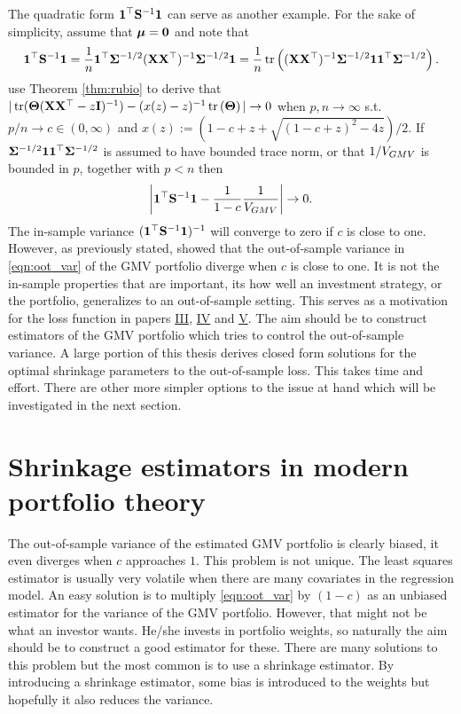 \documentclass[12pt, twoside]{book}\usepackage{knitr}
\begin{document}
The quadratic form $\mathbf{1}^\top \mathbf{S}^{-1} \mathbf{1}$ can serve as another example. 
For the sake of simplicity, assume that $\mbox{\boldmath$\mu$} = \mathbf{0}$ and note that
\begin{equation}
  \mathbf{1}^\top \mathbf{S}^{-1} \mathbf{1} = \frac{1}{n}\mathbf{1}^\top \mathbf{\Sigma}^{-1/2} (\mathbf{X} \mathbf{X}^\top)^{-1} \mathbf{\Sigma}^{-1/2} \mathbf{1} = \frac{1}{n}\operatorname{tr} \left((\mathbf{X} \mathbf{X}^\top)^{-1} \mathbf{\Sigma}^{-1/2} \mathbf{1}\mathbf{1}^\top \mathbf{\Sigma}^{-1/2}\right).
\end{equation}
\citet{bodnar2018estimation} use Theorem \ref{thm:rubio} to derive that $|\operatorname{tr}(\mathbf{\Theta}(\mathbf{X} \mathbf{X}^\top -z\mathbf{I})^{-1}) - (x(z)-z)^{-1}\operatorname{tr}\left(\mathbf{\Theta}\right)| \rightarrow 0$ when $p,n \rightarrow \infty$ s.t. $p/n \rightarrow c \in (0,\infty)$ and $x(z) := (1-c + z + \sqrt{(1-c+z)^2-4z})/2$.
If $\mathbf{\Sigma}^{-1/2} \mathbf{1}\mathbf{1}^\top \mathbf{\Sigma}^{-1/2}$ is assumed to have bounded trace norm, or that $1/V_{GMV}$ is bounded in $p$, together with $p<n$ then
$$
\left|\mathbf{1}^\top \mathbf{S}^{-1} \mathbf{1} - \frac{1}{1-c}\frac{1}{V_{GMV}}\right| \rightarrow 0.
$$
The in-sample variance $(\mathbf{1}^\top \mathbf{S}^{-1}\mathbf{1})^{-1}$ will converge to zero if $c$ is close to one.
However, as previously stated, \citet{bodnar2018estimation} showed that the out-of-sample variance in \eqref{eqn:oot_var} of the GMV portfolio diverge when $c$ is close to one.
It is not the in-sample properties that are important, its how well an investment strategy, or the portfolio, generalizes to an out-of-sample setting.
This serves as a motivation for the loss function in papers \hyperref[sec:paper3]{III}, \hyperref[sec:paper4]{IV} and \hyperref[sec:paper5]{V}.
The aim should be to construct estimators of the GMV portfolio which tries to control the out-of-sample variance.
A large portion of this thesis derives closed form solutions for the optimal shrinkage parameters to the out-of-sample loss.
This takes time and effort.
There are other more simpler options to the issue at hand which will be investigated in the next section.

\section{Shrinkage estimators in modern portfolio theory}
The out-of-sample variance of the estimated GMV portfolio is clearly biased, it even diverges when $c$ approaches $1$.
This problem is not unique.
The least squares estimator is usually very volatile when there are many covariates in the regression model. 
An easy solution is to multiply \eqref{eqn:oot_var} by $(1-c)$ as an unbiased estimator for the variance of the GMV portfolio.
However, that might not be what an investor wants.
He/she invests in portfolio weights, so naturally the aim should be to construct a good estimator for these.
There are many solutions to this problem but the most common is to use a shrinkage estimator.
By introducing a shrinkage estimator, some bias is introduced to the weights but hopefully it also reduces the variance.
\end{document}
